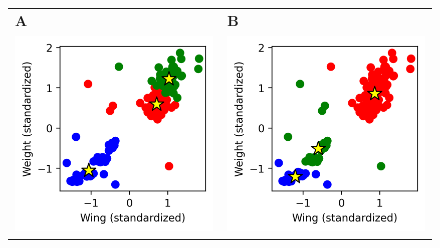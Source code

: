 \documentclass[12pt]{article}
\begin{document}
\begin{figure}[htb]
    \begin{tabular}{ll}
      \textbf{A}&\textbf{B}\\
      \includegraphics{04.1_khawks_142.png}&
      \includegraphics{04.1_khawks_42.png}

\end{tabular}
\end{figure}
\end{document}
